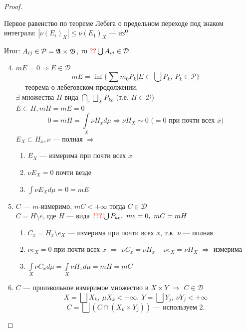 \documentclass[english]{article}
\theoremstyle{plain}
\theoremstyle{remark}
\theoremstyle{definition}
\begin{document}
\begin{proof}
\begin{enumerate}
\begin{enumerate}
Первое равенство по теореме Лебега о предельном переходе под знаком интеграла: \(|\nu (E_i)_X| \le \nu (E_1)_X\) --- из\(\footnotemark[\value{footnote}]\)
\end{enumerate}
\end{enumerate}
Итог: \(A_{ij} \in \mathcal{P} = \mathfrak{A} \times \mathfrak{B}\), то \(\color{red}??\color{black}\bigcup A_{ij} \in \mathcal{D}\)
\begin{enumerate}
\setcounter{enumi}{3}
\item \(mE = 0 \Rightarrow E \in \mathcal{D}\)
\[ mE = \inf\{\sum m_0 P_k | E \subset \bigcup P_k,\ P_k \in \mathcal{P}\} \]
--- теорема о лебеговском продолжении. \\
\(\exists\) множества \(H\) вида \(\bigcap\limits_e\bigsqcup\limits_X P_{ke}\) (т.е. \(H \in \mathcal{D}\)) \\
\(E \subset H, mH = mE = 0\)
\[ 0 = mH = \int\limits_X \nu H_x d\mu \Rightarrow \nu H_X \sim 0\text{ (\(=0\) при почти всех \(x\))} \]
\(E_X \subset H_x, \nu\) --- полная \(\Rightarrow\)
\begin{enumerate}
\item \(E_X\) --- измерима при почти всех \(x\)
\item \(\nu E_X = 0\) почти везде
\item \(\int \nu E_X d\mu = 0 = m E\)
\end{enumerate}
\item \(C\) --- \(m\)-измеримо, \(mC < + \infty\) тогда \(C \in \mathcal{D}\) \\
\(C = H \setminus e\), где \(H\) --- вида \(\color{red}???\color{black}\bigcup P_{ke},\ me = 0,\ mC = mH\)
\begin{enumerate}
\item \(C_x = H_x \setminus e_X\) --- измерима при почти всех \(x\), т.к. \(\nu\) --- полная
\item \(\nu e_X = 0\) при почти всех \(x\) \(\Rightarrow\) \(\nu C_x = \nu H_x - \nu e_X = \nu H_X\) \(\Rightarrow\) измерима
\item \(\int\limits_X \nu C_x d\mu = \int\limits_X \nu H_x d\mu = mH = mC\)
\end{enumerate}
\item \(C\) --- произвольное измеримое множество в \(X \times Y\) \(\Rightarrow\) \(C \in \mathcal{D}\) \\
\[ X = \bigsqcup X_k,\ \mu X_k < + \infty,\ Y = \bigsqcup Y_j,\ \nu Y_j < + \infty \]
\[ C = \bigsqcup (C \cap (X_k \times Y_j))\text{ --- используем 2.}\]
\end{enumerate}
\end{proof}
\end{document}
